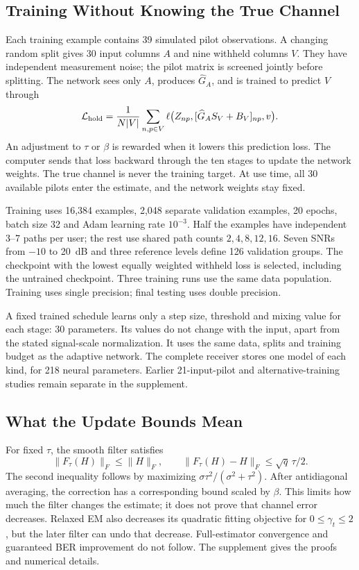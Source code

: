 \documentclass[10pt,journal,letterpaper]{IEEEtran}
\begin{document}
\subsection{Training Without Knowing the True Channel}
Each training example contains 39 simulated pilot observations. A changing random split gives 30 input columns $A$ and nine withheld columns $V$. They have independent measurement noise; the pilot matrix is screened jointly before splitting. The network sees only $A$, produces $\widehat G_A$, and is trained to predict $V$ through
\begin{equation}
 \mathcal L_{\rm hold}=\frac{1}{N|V|}\sum_{n,p\in V}
 \ell\big(Z_{np},[\widehat G_A S_V+B_V]_{np},v\big).
\end{equation}
An adjustment to $\tau$ or $\beta$ is rewarded when it lowers this prediction loss. The computer sends that loss backward through the ten stages to update the network weights. The true channel is never the training target. At use time, all 30 available pilots enter the estimate, and the network weights stay fixed.

Training uses 16,384 examples, 2,048 separate validation examples, 20 epochs, batch size 32 and Adam learning rate $10^{-3}$. Half the examples have independent 3--7 paths per user; the rest use shared path counts $2,4,8,12,16$. Seven SNRs from $-10$ to 20~dB and three reference levels define 126 validation groups. The checkpoint with the lowest equally weighted withheld loss is selected, including the untrained checkpoint. Three training runs use the same data population. Training uses single precision; final testing uses double precision.

A fixed trained schedule learns only a step size, threshold and mixing value for each stage: 30 parameters. Its values do not change with the input, apart from the stated signal-scale normalization. It uses the same data, splits and training budget as the adaptive network. The complete receiver stores one model of each kind, for 218 neural parameters. Earlier 21-input-pilot and alternative-training studies remain separate in the supplement.

\subsection{What the Update Bounds Mean}
For fixed $\tau$, the smooth filter satisfies
\begin{equation}
 \|F_\tau(H)\|_F\le\|H\|_F,\qquad
 \|F_\tau(H)-H\|_F\le\sqrt q\,\tau/2.
 \label{eq:bound}
\end{equation}
The second inequality follows by maximizing $\sigma\tau^2/(\sigma^2+\tau^2)$. After antidiagonal averaging, the correction has a corresponding bound scaled by $\beta$. This limits how much the filter changes the estimate; it does not prove that channel error decreases. Relaxed EM also decreases its quadratic fitting objective for $0\le\gamma_t\le2$, but the later filter can undo that decrease. Full-estimator convergence and guaranteed BER improvement do not follow. The supplement gives the proofs and numerical details.
\end{document}
